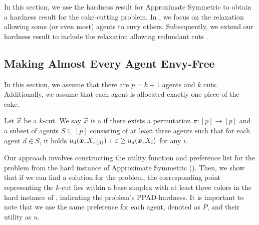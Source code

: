 In this section, we use the hardness result for \outofk Approximate Symmetric \Sperner to obtain a hardness result for the cake-cutting problem. 
In , we focus on the relaxation allowing some (or even most) agents to envy others.  Subsequently, we extend our hardness result to include the relaxation allowing redundant cuts .






\subsection{Making Almost Every Agent Envy-Free}\label{sec:making-almost-everyone-happy}

In this section, we assume that there are $p = k + 1$ agents and $k$ cuts. Additionally, we assume that each agent is allocated exactly one piece of the cake.

\begin{definition}[\mccc]
Let $\vec{x}$ be a $k$-cut. We say $\vec{x}$ is a \mccs{} if there exists a permutation $\pi: [p] \rightarrow [p]$ and a subset of agents $S \subseteq [p]$ consisting of at least three agents such that for each agent $d \in S$, it holds $u_d(\boldsymbol{x}, X_{\pi(d)}) + \varepsilon \geq u_d(\boldsymbol{x}, X_{i})$ for any $i$. 
\end{definition}


Our approach involves constructing the utility function and preference list for the \mccs{} problem from the hard instance of \outofk Approximate Symmetric \Sperner (). Then, we show that if we can find a solution for the \mccs{} problem, the corresponding point representing the $k$-cut lies within a base simplex with at least three colors in the hard instance of , indicating the problem's PPAD-hardness. It is important to note that we use the same preference for each agent, denoted as $P$, and their utility as $u$.


